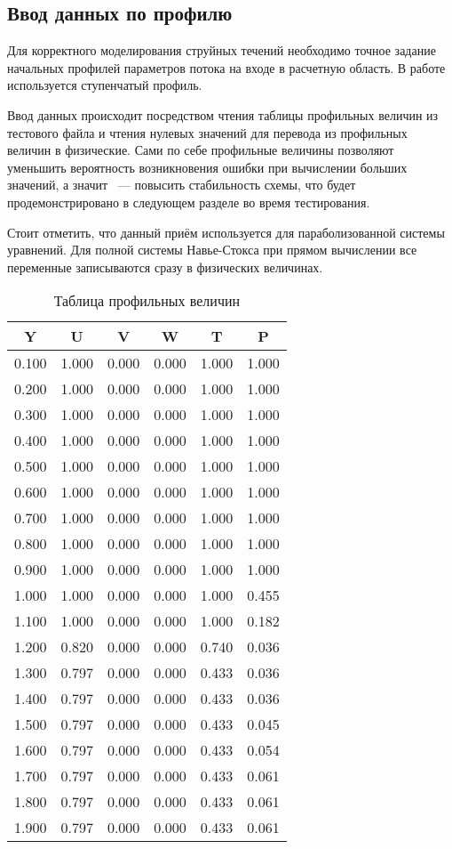 \subsection{Ввод данных по профилю}

Для корректного моделирования струйных течений необходимо точное задание начальных профилей параметров потока на входе в расчетную область. В работе используется ступенчатый профиль.

Ввод данных происходит посредством чтения таблицы профильных величин из тестового файла и чтения нулевых значений для перевода из профильных величин в физические. Сами по себе профильные величины позволяют уменьшить вероятность возникновения ошибки при вычислении больших значений, а значит ~--- повысить стабильность схемы, что будет продемонстрировано в следующем разделе во время тестирования.

Стоит отметить, что данный приём используется для параболизованной системы уравнений. Для полной системы Навье-Стокса при прямом вычислении все переменные записываются сразу в физических величинах.

\begin{table}
    \caption{Таблица профильных величин}
    \begin{tabular}{|c|c|c|c|c|c|}
    \hline
     Y &  U &   V &  W &   T &  P \\
    \hline
    0.100 & 1.000 & 0.000 & 0.000 & 1.000 & 1.000 \\
    0.200 & 1.000 & 0.000 & 0.000 & 1.000 & 1.000 \\
    0.300 & 1.000 & 0.000 & 0.000 & 1.000 & 1.000 \\
    0.400 & 1.000 & 0.000 & 0.000 & 1.000 & 1.000 \\
    0.500 & 1.000 & 0.000 & 0.000 & 1.000 & 1.000 \\
    0.600 & 1.000 & 0.000 & 0.000 & 1.000 & 1.000 \\
    0.700 & 1.000 & 0.000 & 0.000 & 1.000 & 1.000 \\
    0.800 & 1.000 & 0.000 & 0.000 & 1.000 & 1.000 \\
    0.900 & 1.000 & 0.000 & 0.000 & 1.000 & 1.000 \\
    1.000 & 1.000 & 0.000 & 0.000 & 1.000 & 0.455 \\
    1.100 & 1.000 & 0.000 & 0.000 & 1.000 & 0.182 \\
    1.200 & 0.820 & 0.000 & 0.000 & 0.740 & 0.036 \\
    1.300 & 0.797 & 0.000 & 0.000 & 0.433 & 0.036 \\
    1.400 & 0.797 & 0.000 & 0.000 & 0.433 & 0.036 \\
    1.500 & 0.797 & 0.000 & 0.000 & 0.433 & 0.045 \\
    1.600 & 0.797 & 0.000 & 0.000 & 0.433 & 0.054 \\
    1.700 & 0.797 & 0.000 & 0.000 & 0.433 & 0.061 \\
    1.800 & 0.797 & 0.000 & 0.000 & 0.433 & 0.061 \\
    1.900 & 0.797 & 0.000 & 0.000 & 0.433 & 0.061 \\
    \hline
    \end{tabular}
    \label{tab:profile}
\end{table}

